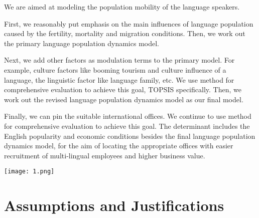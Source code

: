 \documentclass{mcmthesis}
\begin{document}
We are aimed at modeling the population mobility of the language speakers.

First, we reasonably put emphasis on the main influences of language population caused by the fertility, mortality and migration conditions. Then, we work out the primary language population dynamics model.

Next, we add other factors as modulation terms to the primary model. For example, culture factors like booming tourism and culture influence of a language, the linguistic factor like language family, etc. We use method for comprehensive evaluation to achieve this goal, TOPSIS specifically. Then, we work out the revised language population dynamics model as our final model.

Finally, we can pin the suitable international offices. We continue to use method for comprehensive evaluation to achieve this goal. The determinant includes the English popularity and economic conditions besides the final language population dynamics model, for the aim of locating the appropriate offices with easier recruitment of multi-lingual employees and higher business value.

\texttt{[image: 1.png]}

\section{Assumptions and Justifications}
\end{document}
